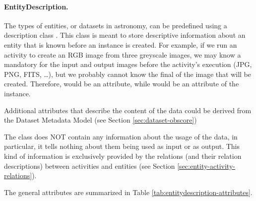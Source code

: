 \paragraph{EntityDescription.}
The types of entities, or datasets in astronomy, can be predefined using a
description class . This class is meant to store
descriptive information %
about an entity that is known before an  instance is created.
For example, if we run an activity to create an RGB image from three greyscale
images, we may know a mandatory  for the input and output
images before the activity's execution (JPG, PNG, FITS, \ldots), but we probably
cannot know the final  of the image  that will be created.
Therefore,  would be an  attribute,
while  would be an attribute of the  instance. 

Additional attributes that describe the content of the data could be derived from 
the Dataset Metadata Model (see Section \ref{sec:dataset-obscore})

The  class does NOT contain any information about the
usage of the data, in particular, it tells nothing about them being used as
input or as output. This kind of information is exclusively provided by the
relations (and their relation descriptions) between activities and entities
(see Section \ref{sec:entity-activity-relations}).

The  general attributes are summarized in Table 
\ref{tab:entitydescription-attributes}.



